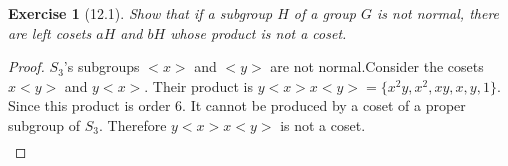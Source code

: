 \documentclass[12pt]{article}
\newtheorem*{exer}{Exercise}
\begin{document}

\begin{exer}[12.1]
Show that if a subgroup $H$ of a group $G$ is not normal, there are left
cosets $aH$ and $bH$ whose product is not a coset. 
\end{exer}

\begin{proof}

$S_3$'s subgroups $<x>$ and $<y>$ are not normal.Consider the cosets $x<y>$
and $y<x>$. Their product is $y<x>x<y> = \{x^2y, x^2, xy, x, y, 1\}$.
Since this product is order 6. It cannot be produced by a coset of a proper
subgroup of $S_3$. Therefore $y<x>x<y>$ is not a coset.
    \begin{align*}
    \end{align*}

\end{proof}

\end{document}
